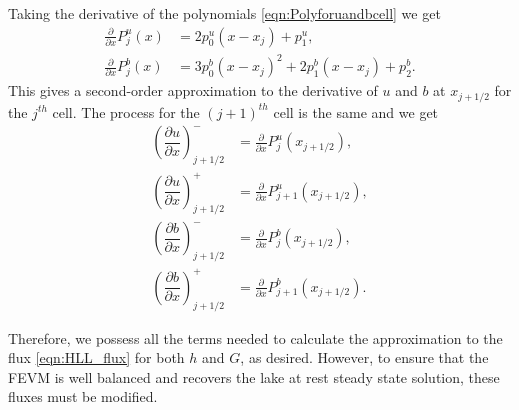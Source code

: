 Taking the derivative of the polynomials \eqref{eqn:Polyforuandbcell} we get
	\begin{align*}
	\frac{\partial }{\partial x}P^u_j(x) &= 2p^u_0 \left(x - x_j\right) + p^u_1, \\
	\frac{\partial }{\partial x}P^b_j(x) &= 3p^b_0 \left(x - x_j\right)^2 + 2p^b_1 \left(x - x_j\right) + p^b_2.
	\end{align*}
This gives a second-order approximation to the derivative of $u$ and $b$ at $x_{j+1/2}$ for the $j^{th}$ cell. The process for the $(j+1)^{th}$ cell is the same and we get 
\begin{subequations}
	\begin{align}
	\left(\dfrac{\partial {u}}{\partial x} \right)^-_{j + 1/2} &= \frac{\partial }{\partial x}P^u_j(x_{j+1/2}),  \\
	\left(\dfrac{\partial {u}}{\partial x} \right)^+_{j + 1/2} &= \frac{\partial }{\partial x}P^u_{j+1}(x_{j+1/2}),  \\
	\left(\dfrac{\partial {b}}{\partial x} \right)^-_{j + 1/2} &= \frac{\partial }{\partial x}P^b_j(x_{j+1/2}), \\
	\left(\dfrac{\partial {b}}{\partial x} \right)^+_{j + 1/2} &= \frac{\partial }{\partial x}P^b_{j+1}(x_{j+1/2}). 	\end{align}
	\label{eqn:dbduRecon}
\end{subequations}

Therefore, we possess all the terms needed to calculate the approximation to the flux \eqref{eqn:HLL_flux} for both $h$ and $G$, as desired. However, to ensure that the FEVM is well balanced and recovers the lake at rest steady state solution, these fluxes must be modified.

